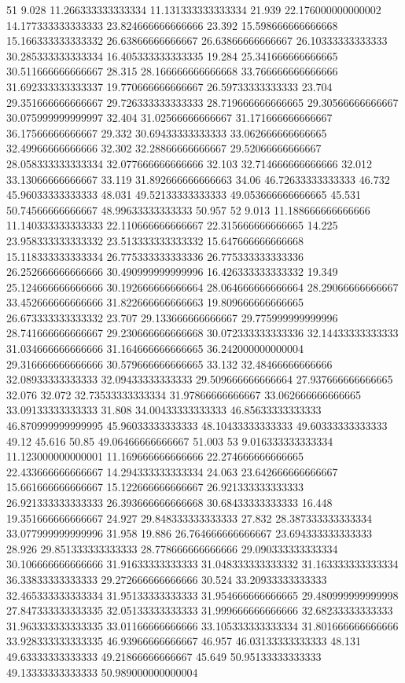 51 9.028 11.266333333333334 11.131333333333334 21.939 22.176000000000002 14.177333333333333 23.824666666666666 23.392 15.598666666666668 15.166333333333332 26.63866666666667 26.63866666666667 26.10333333333333 30.285333333333334 16.405333333333335 19.284 25.341666666666665 30.511666666666667 28.315 28.166666666666668 33.766666666666666 31.692333333333337 19.770666666666667 26.59733333333333 23.704 29.351666666666667 29.726333333333333 28.719666666666665 29.30566666666667 30.075999999999997 32.404 31.02566666666667 31.171666666666667 36.17566666666667 29.332 30.69433333333333 33.062666666666665 32.49966666666666 32.302 32.28866666666667 29.52066666666667 28.058333333333334 32.077666666666666 32.103 32.714666666666666 32.012 33.13066666666667 33.119 31.892666666666663 34.06 46.72633333333333 46.732 45.96033333333333 48.031 49.52133333333333 49.053666666666665 45.531 50.74566666666667 48.99633333333333 50.957
52 9.013 11.188666666666666 11.140333333333333 22.110666666666667 22.315666666666665 14.225 23.958333333333332 23.513333333333332 15.647666666666668 15.118333333333334 26.775333333333336 26.775333333333336 26.252666666666666 30.490999999999996 16.426333333333332 19.349 25.124666666666666 30.192666666666664 28.064666666666664 28.29066666666667 33.452666666666666 31.822666666666663 19.809666666666665 26.673333333333332 23.707 29.133666666666667 29.775999999999996 28.741666666666667 29.230666666666668 30.072333333333336 32.14433333333333 31.034666666666666 31.164666666666665 36.242000000000004 29.316666666666666 30.579666666666665 33.132 32.48466666666666 32.08933333333333 32.09433333333333 29.509666666666664 27.937666666666665 32.076 32.072 32.73533333333334 31.97866666666667 33.062666666666665 33.09133333333333 31.808 34.00433333333333 46.85633333333333 46.870999999999995 45.96033333333333 48.10433333333333 49.60333333333333 49.12 45.616 50.85 49.06466666666667 51.003
53 9.016333333333334 11.123000000000001 11.169666666666666 22.274666666666665 22.433666666666667 14.294333333333334 24.063 23.642666666666667 15.661666666666667 15.122666666666667 26.921333333333333 26.921333333333333 26.393666666666668 30.68433333333333 16.448 19.351666666666667 24.927 29.848333333333333 27.832 28.387333333333334 33.077999999999996 31.958 19.886 26.764666666666667 23.694333333333333 28.926 29.851333333333333 28.778666666666666 29.090333333333334 30.106666666666666 31.91633333333333 31.048333333333332 31.163333333333334 36.33833333333333 29.272666666666666 30.524 33.20933333333333 32.465333333333334 31.95133333333333 31.954666666666665 29.480999999999998 27.847333333333335 32.05133333333333 31.999666666666666 32.68233333333333 31.963333333333335 33.01166666666666 33.105333333333334 31.801666666666666 33.928333333333335 46.93966666666667 46.957 46.03133333333333 48.131 49.63333333333333 49.21866666666667 45.649 50.95133333333333 49.13333333333333 50.989000000000004
